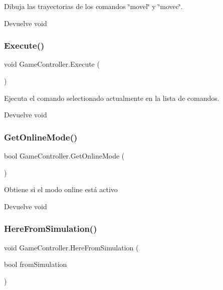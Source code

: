 Dibuja las trayectorias de los comandos \char`\"{}movel\char`\"{} y \char`\"{}movec\char`\"{}. \begin{DoxyReturn}{Devuelve}
void 
\end{DoxyReturn}
\mbox{\label{class_game_controller_ac1dcb5c2f0422f5568ca776dd5cd7b7c}} 
\subsubsection{\texorpdfstring{Execute()}{Execute()}}
{\footnotesize\ttfamily void Game\+Controller.\+Execute (\begin{DoxyParamCaption}{ }\end{DoxyParamCaption})\hspace{0.3cm}{\ttfamily [inline]}}

Ejecuta el comando selectionado actualmente en la lista de comandos. \begin{DoxyReturn}{Devuelve}
void 
\end{DoxyReturn}
\mbox{\label{class_game_controller_ab8bc597c4e47a3cece068762cdfaf33a}} 
\subsubsection{\texorpdfstring{GetOnlineMode()}{GetOnlineMode()}}
{\footnotesize\ttfamily bool Game\+Controller.\+Get\+Online\+Mode (\begin{DoxyParamCaption}{ }\end{DoxyParamCaption})\hspace{0.3cm}{\ttfamily [inline]}}

Obtiene si el modo online está activo \begin{DoxyReturn}{Devuelve}
void 
\end{DoxyReturn}
\mbox{\label{class_game_controller_a6ac352c2a0b3dafb1da0a71fb047736e}} 
\subsubsection{\texorpdfstring{HereFromSimulation()}{HereFromSimulation()}}
{\footnotesize\ttfamily void Game\+Controller.\+Here\+From\+Simulation (\begin{DoxyParamCaption}\item[{bool}]{from\+Simulation }\end{DoxyParamCaption})\hspace{0.3cm}{\ttfamily [inline]}}

